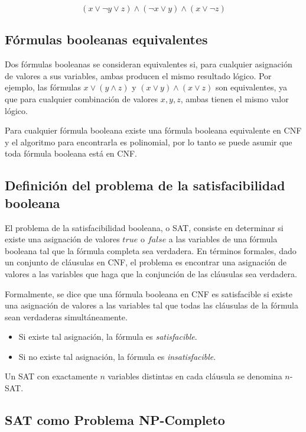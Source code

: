\[
      (x \vee \neg y \vee z) \wedge (\neg x \vee y) \wedge (x \vee \neg z)
\]

\subsection{Fórmulas booleanas equivalentes}

Dos fórmulas booleanas se consideran equivalentes si, para cualquier asignación de valores a sus variables, ambas producen el mismo resultado lógico. Por ejemplo, las fórmulas \( x \vee (y \wedge z) \) y \( (x \vee y) \wedge (x \vee z) \) son equivalentes, ya que para cualquier combinación de valores \( x, y, z \), ambas tienen el mismo valor lógico.

Para cualquier fórmula booleana existe una fórmula booleana equivalente en CNF \cite{authomataTheory} y 
el algoritmo para encontrarla es polinomial, por lo tanto se puede asumir que toda fórmula booleana está en CNF.

\subsection{Definición del problema de la satisfacibilidad booleana}

El problema de la satisfacibilidad booleana, o SAT, consiste en determinar si existe una asignación de valores \( true \) o \( false \) a las variables de una fórmula booleana tal que la fórmula completa sea verdadera. En términos formales, dado un conjunto de cláusulas en CNF, el problema es encontrar una asignación de valores a las variables que haga que la conjunción de las cláusulas sea verdadera.

Formalmente, se dice que una fórmula booleana en CNF es satisfacible si existe una asignación de valores a las variables tal que todas las cláusulas de la fórmula sean verdaderas simultáneamente.

\begin{itemize}
      \item Si existe tal asignación, la fórmula es \textit{satisfacible}.
      \item Si no existe tal asignación, la fórmula es \textit{insatisfacible}.
\end{itemize}

Un SAT con exactamente $n$ variables distintas en cada cláusula se denomina $n$-SAT.
\subsection{SAT como Problema NP-Completo}

